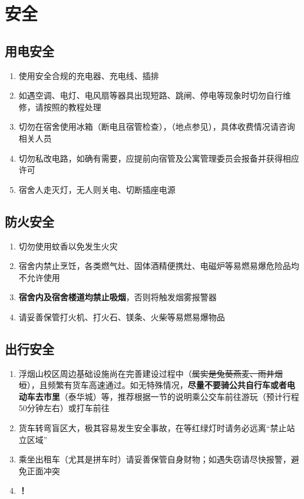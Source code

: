 \chapter[安全]{安全}

\section[用电安全]{用电安全}
\begin{enumerate}
    \item 使用安全合规的充电器、充电线、插排
    \item 如遇空调、电灯、电风扇等器具出现短路、跳闸、停电等现象时切勿自行维修，请按照的教程处理
    \item 切勿在宿舍使用冰箱（断电且宿管检查），\textbf{}（地点参见），具体收费情况请咨询相关人员
    \item 切勿私改电路，如确有需要，应提前向宿管及公寓管理委员会\footnotemark 报备并获得相应许可
    \item 宿舍人走灭灯，无人则关电、切断插座电源
\end{enumerate}

\section[防火安全]{防火安全}
\begin{enumerate}
    \item 切勿使用蚊香以免发生火灾
    \item 宿舍内禁止烹饪，各类燃气灶、固体酒精便携灶、电磁炉等易燃易爆危险品均不允许使用
    \item \textbf{宿舍内及宿舍楼道均禁止吸烟}，否则将触发烟雾报警器
    \item 请妥善保管打火机、打火石、镁条、火柴等易燃易爆物品
\end{enumerate}

\section[出行安全]{出行安全}
\begin{enumerate}
    \item 浮烟山校区周边基础设施尚在完善建设过程中（\sout{属实是兔葵燕麦、雨井烟垣}），且频繁有货车高速通过。如无特殊情况，\textbf{尽量不要骑公共自行车或者电动车去市里}（泰华城）等，推荐根据一节的说明乘公交车前往游玩（预计行程50分钟左右）或打车前往
    \item 货车转弯盲区大，极其容易发生安全事故，在等红绿灯时请务必远离“禁止站立区域”
    \item 乘坐出租车（尤其是拼车时）请妥善保管自身财物；如遇失窃请尽快报警，避免正面冲突
    \item \textbf{！}
\end{enumerate}

